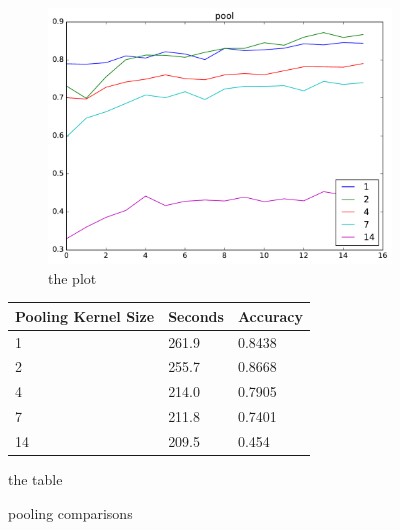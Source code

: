 \documentclass{article}
\begin{document}
\begin{enumerate}
\begin{item}
		\begin{figure}[h]
			\centering	
			\begin{subfigure}[b]{0.45\textwidth}
				\includegraphics[width=\textwidth]{figures/pool_cpu}
				\caption{the plot}
				\label{fig:pooling_cpu}
			\end{subfigure}	
			\quad
			\begin{subtable}[b]{0.4\textwidth}
				\begin{tabular}{lll}
					\toprule
					Pooling Kernel Size     & Seconds & Accuracy \\
					\midrule
					1 & 261.9 & 0.8438 \\
					2 & 255.7 & 0.8668 \\
					4 & 214.0 & 0.7905 \\
					7 & 211.8 & 0.7401 \\
					14 & 209.5 & 0.454 \\
					\bottomrule
				\end{tabular}
				\caption{the table}
				\label{pooling_comp_table}
			\end{subtable}	
			\caption{pooling comparisons}
			\label{pooling_comparisons}
		\end{figure}
	\end{item}

	
\end{enumerate}
\end{document}
